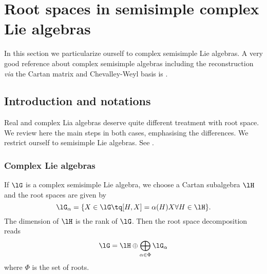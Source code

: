 \section{Root spaces in semisimple complex Lie algebras}
\label{SecRootcomplexss}
In this section we particularize ourself to complex semisimple Lie algebras. A very good reference about complex semisimple algebras including the reconstruction \emph{via} the Cartan matrix and Chevalley-Weyl basis is \cite{SerreSSAlgebres}.

\subsection{Introduction and notations}

Real and complex Lia algebras deserve quite different treatment with root space. We review here the main steps in both cases, emphasising the differences. We restrict ourself to semisimple Lie algebras. See \cite{Wisser}.

\subsubsection{Complex Lie algebras}

If \( \lG\) is a complex semisimple Lie algebra, we choose a Cartan subalgebra \( \lH\) and the root spaces are given by
\begin{equation}
    \lG_{\alpha}=\{ X\in\lG\tq [H,X]=\alpha(H)X \forall H\in\lH \}.
\end{equation}
The dimension of \( \lH\) is the rank of \( \lG\). Then the root space decomposition reads
\begin{equation}
    \lG=\lH\oplus\bigoplus_{\alpha\in\Phi}\lG_{\alpha}
\end{equation}
where \( \Phi\) is the set of roots.

